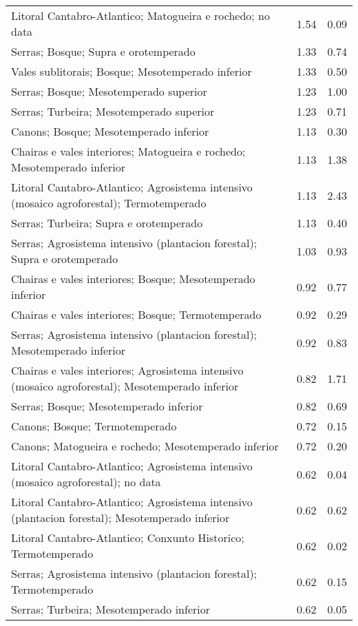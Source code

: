 \begin{table}[p]
\begin{tabular}{lrr}
  Litoral Cantabro-Atlantico; Matogueira e rochedo; no data & 1.54 & 0.09 \\ 
  Serras; Bosque; Supra e orotemperado & 1.33 & 0.74 \\ 
  Vales sublitorais; Bosque; Mesotemperado inferior & 1.33 & 0.50 \\ 
  Serras; Bosque; Mesotemperado superior & 1.23 & 1.00 \\ 
  Serras; Turbeira; Mesotemperado superior & 1.23 & 0.71 \\ 
  Canons; Bosque; Mesotemperado inferior & 1.13 & 0.30 \\ 
  Chairas e vales interiores; Matogueira e rochedo; Mesotemperado inferior & 1.13 & 1.38 \\ 
  Litoral Cantabro-Atlantico; Agrosistema intensivo (mosaico agroforestal); Termotemperado & 1.13 & 2.43 \\ 
  Serras; Turbeira; Supra e orotemperado & 1.13 & 0.40 \\ 
  Serras; Agrosistema intensivo (plantacion forestal); Supra e orotemperado & 1.03 & 0.93 \\ 
  Chairas e vales interiores; Bosque; Mesotemperado inferior & 0.92 & 0.77 \\ 
  Chairas e vales interiores; Bosque; Termotemperado & 0.92 & 0.29 \\ 
  Serras; Agrosistema intensivo (plantacion forestal); Mesotemperado inferior & 0.92 & 0.83 \\ 
  Chairas e vales interiores; Agrosistema intensivo (mosaico agroforestal); Mesotemperado inferior & 0.82 & 1.71 \\ 
  Serras; Bosque; Mesotemperado inferior & 0.82 & 0.69 \\ 
  Canons; Bosque; Termotemperado & 0.72 & 0.15 \\ 
  Canons; Matogueira e rochedo; Mesotemperado inferior & 0.72 & 0.20 \\ 
  Litoral Cantabro-Atlantico; Agrosistema intensivo (mosaico agroforestal); no data & 0.62 & 0.04 \\ 
  Litoral Cantabro-Atlantico; Agrosistema intensivo (plantacion forestal); Mesotemperado inferior & 0.62 & 0.62 \\ 
  Litoral Cantabro-Atlantico; Conxunto Historico; Termotemperado & 0.62 & 0.02 \\ 
  Serras; Agrosistema intensivo (plantacion forestal); Termotemperado & 0.62 & 0.15 \\ 
  Serras; Turbeira; Mesotemperado inferior & 0.62 & 0.05 \\ 

\end{tabular}
\end{table}
